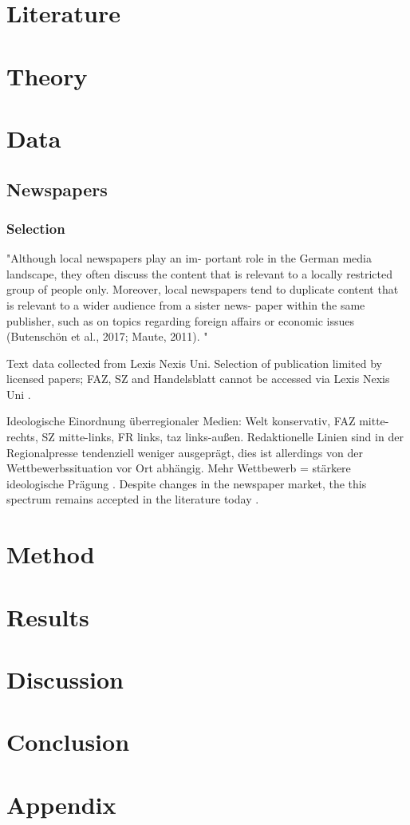 \documentclass[12pt,oneside,a4paper]{article}
\begin{document}
\section{Literature}
%

\section{Theory}
%

\section{Data}
%
\subsection{Newspapers}
\subsubsection{Selection}
"Although local newspapers play an im-
portant role in the German media landscape, they often discuss the content that is
relevant to a locally restricted group of people only. Moreover, local newspapers tend to duplicate content that is relevant to a wider audience from a sister news-
paper within the same publisher, such as on topics regarding foreign affairs or
economic issues (Butenschön et al., 2017; Maute, 2011). " \parencite{Falck2019}

Text data collected from Lexis Nexis Uni. Selection of publication limited by licensed papers; FAZ, SZ and Handelsblatt cannot be accessed via Lexis Nexis Uni \parencite{LexisNexis2023}.

Ideologische Einordnung überregionaler Medien: Welt konservativ, FAZ mitte-rechts, SZ mitte-links, FR links, taz links-außen. Redaktionelle Linien sind in der Regionalpresse tendenziell weniger ausgeprägt, dies ist allerdings von der Wettbewerbssituation vor Ort abhängig. Mehr Wettbewerb = stärkere ideologische Prägung \parencite[pp. 129-130]{Maurer2006}. Despite changes in the newspaper market, the this spectrum remains accepted in the literature today \parencite[pp. 59-60]{Merkle2019}.

\section{Method}

\section{Results}
%

\section{Discussion}
%

\section{Conclusion}
%

\newpage
\printbibliography

\newpage

\section*{Appendix}
%
\end{document}
